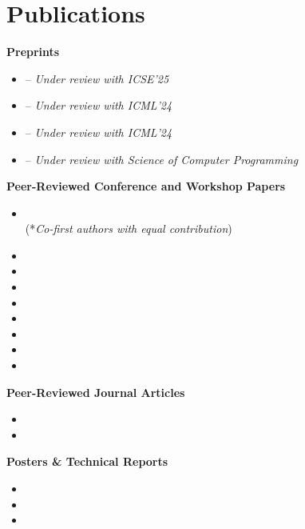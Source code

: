 \documentclass[letterpaper,11pt]{article}
\begin{document}
\section{Publications}

\textbf{Preprints}\vspace{-4pt}
\begin{itemize}
  \item {} -- \emph{Under review with ICSE'25}
  \item {} -- \emph{Under review with ICML'24}
  \item {} -- \emph{Under review with ICML'24}
  \item {} -- \emph{Under review with Science of Computer Programming}
\end{itemize}


\textbf{Peer-Reviewed Conference and Workshop Papers}\vspace{-4pt}

\begin{itemize}
  \item {} \\ (*\emph{Co-first authors with equal contribution})
  \item {}
  \item {}
  \item {}
  \item {}
  \item {}
  \item {}
  \item {}
  \item {}
\end{itemize}

\textbf{Peer-Reviewed Journal Articles}\vspace{-4pt}

\begin{itemize}
  \item {}
  \item {}
\end{itemize}

\textbf{Posters \& Technical Reports}\vspace{-4pt}
\begin{itemize}
  \item {}
  \item {}
  \item {}
\end{itemize}
\end{document}
